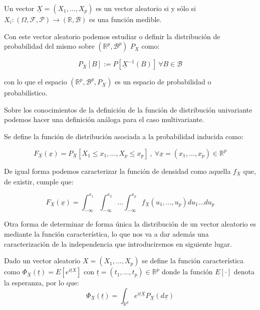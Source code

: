 \begin{proposicion}
	Un vector $\underline{X} = (X_1, ..., X_p)$ es un vector aleatorio si y sólo si $X_i : (\Omega , \mathcal{F}, \mathcal{P}) \rightarrow (\mathbb{R}, \mathcal{B})$ es una función medible.
\end{proposicion}

Con este vector aleatorio podemos estudiar o definir la distribución de probabilidad del mismo sobre $( \mathbb{R}^p , \mathcal{B}^p )$ $P_{\underline{X}}$ como:

$$P_{\underline{X}} [B]:= P[\underline{X}^{-1}(B)] \ \forall B\in \mathcal{B}$$

con lo que el espacio $(\mathbb{R}^p , \mathcal{B}^p , P_{\underline{X}})$ es un espacio de probabilidad o probabilístico.

Sobre los conocimientos de la definición de la función de distribución univariante podemos hacer una definición análoga para el caso multivariante.

\begin{definicion}
	Se define la función de distribución asociada a la probabilidad inducida como:
	
	$$F_{\underline{X}} (\underline{x}) = P_{\underline{X}} [X_1 \leq x_1 , ... , X_p \leq x_p] \ , \ \forall \underline{x} = (x_1 , ... , x_p) \in \mathbb{R}^p$$
\end{definicion}

De igual forma podemos caracterizar la función de densidad como aquella $f_{\underline{X}}$ que, de existir, cumple que:

$$F_{\underline{X}} (\underline{x}) = \int_{- \infty}^{x_1} \int_{-\infty}^{x_2} ... \int_{-\infty}^{x_p} f_{\underline{X}}(u_1 , ... , u_p) du_1 ... du_p$$

Otra forma de determinar de forma única la distribución de un vector aleatorio es mediante la función característica, lo que nos va a dar además una caracterización de la independencia que introduciremos en siguiente lugar.

\begin{definicion}
	Dado un vector aleatorio $X = (X_1 , ... , X_p)$ se define la función característica como $\Phi_{\underline{X}} (\underline{t}) = E[e^{i\underline{t}X}]$ con $\underline{t} = (t_1 , ... , t_p)\in \mathbb{R}^p$ donde la función $E[\cdot]$ denota la esperanza, por lo que:
	$$\Phi_{\underline{X}} (\underline{t}) = \int_{\mathbb{R}^p} e^{i\underline{t} \underline{X}} P_{\underline{X}}(d\underline{x})$$
\end{definicion}

